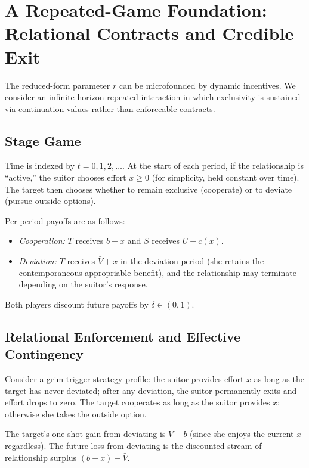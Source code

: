 \documentclass[AER]{AEA}
\begin{document}
\section{A Repeated-Game Foundation: Relational Contracts and Credible Exit}

The reduced-form parameter $r$ can be microfounded by dynamic incentives.
We consider an infinite-horizon repeated interaction in which exclusivity is sustained via continuation values rather than enforceable contracts.

\subsection{Stage Game}

Time is indexed by $t=0,1,2,\dots$.
At the start of each period, if the relationship is ``active,'' the suitor chooses effort $x\ge 0$ (for simplicity, held constant over time).
The target then chooses whether to remain exclusive (cooperate) or to deviate (pursue outside options).

Per-period payoffs are as follows:
\begin{itemize}[leftmargin=0.75in]
\item \emph{Cooperation:} $T$ receives $b+x$ and $S$ receives $U - c(x)$.
\item \emph{Deviation:} $T$ receives $\bar{V}+x$ in the deviation period (she retains the contemporaneous appropriable benefit), and the relationship may terminate depending on the suitor's response.
\end{itemize}

\noindent Both players discount future payoffs by $\delta\in(0,1)$.

\subsection{Relational Enforcement and Effective Contingency}

Consider a grim-trigger strategy profile:
the suitor provides effort $x$ as long as the target has never deviated; after any deviation, the suitor permanently exits and effort drops to zero.
The target cooperates as long as the suitor provides $x$; otherwise she takes the outside option.

The target's one-shot gain from deviating is $\bar{V}-b$ (since she enjoys the current $x$ regardless).
The future loss from deviating is the discounted stream of relationship surplus $(b+x)-\bar{V}$.
\end{document}
